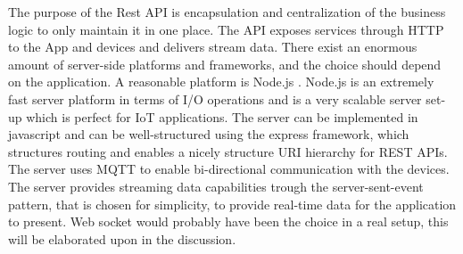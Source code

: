 The purpose of the Rest API is encapsulation and centralization of the business logic to only maintain it in one place. The API exposes services through HTTP to the App and devices and delivers stream data. There exist an enormous amount of server-side platforms and frameworks, and the choice should depend on the application. A reasonable platform is Node.js \cite{node}. Node.js is an extremely fast server platform in terms of I/O operations and is a very scalable server set-up which is perfect for IoT applications. The server can be implemented in javascript and can be well-structured using the express framework, which structures routing and enables a nicely structure URI hierarchy for REST APIs. The server uses MQTT to enable bi-directional communication with the devices. The server provides streaming data capabilities trough the server-sent-event pattern, that is chosen for simplicity, to provide real-time data for the application to present. Web socket would probably have been the choice in a real setup, this will be elaborated upon in the discussion.